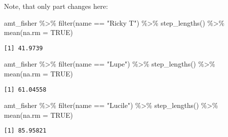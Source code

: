 \documentclass[ignorenonframetext,,t]{beamer}
\newenvironment{Shaded}{\begin{snugshade}}{\end{snugshade}}
\newcommand{\AttributeTok}[1]{\textcolor[rgb]{0.77,0.63,0.00}{#1}}
\newcommand{\ConstantTok}[1]{\textcolor[rgb]{0.00,0.00,0.00}{#1}}
\newcommand{\FunctionTok}[1]{\textcolor[rgb]{0.00,0.00,0.00}{#1}}
\newcommand{\NormalTok}[1]{#1}
\newcommand{\SpecialCharTok}[1]{\textcolor[rgb]{0.00,0.00,0.00}{#1}}
\newcommand{\StringTok}[1]{\textcolor[rgb]{0.31,0.60,0.02}{#1}}
\begin{document}
\begin{frame}[fragile]
Note, that only part changes here:

\begin{Shaded}
\begin{Highlighting}[]
\NormalTok{amt\_fisher }\SpecialCharTok{\%\textgreater{}\%} \FunctionTok{filter}\NormalTok{(name }\SpecialCharTok{==} \StringTok{"Ricky T"}\NormalTok{) }\SpecialCharTok{\%\textgreater{}\%} 
  \FunctionTok{step\_lengths}\NormalTok{() }\SpecialCharTok{\%\textgreater{}\%} \FunctionTok{mean}\NormalTok{(}\AttributeTok{na.rm =} \ConstantTok{TRUE}\NormalTok{)}
\end{Highlighting}
\end{Shaded}

\begin{verbatim}
[1] 41.9739
\end{verbatim}

\begin{Shaded}
\begin{Highlighting}[]
\NormalTok{amt\_fisher }\SpecialCharTok{\%\textgreater{}\%} \FunctionTok{filter}\NormalTok{(name }\SpecialCharTok{==} \StringTok{"Lupe"}\NormalTok{) }\SpecialCharTok{\%\textgreater{}\%} 
  \FunctionTok{step\_lengths}\NormalTok{() }\SpecialCharTok{\%\textgreater{}\%} \FunctionTok{mean}\NormalTok{(}\AttributeTok{na.rm =} \ConstantTok{TRUE}\NormalTok{)}
\end{Highlighting}
\end{Shaded}

\begin{verbatim}
[1] 61.04558
\end{verbatim}

\begin{Shaded}
\begin{Highlighting}[]
\NormalTok{amt\_fisher }\SpecialCharTok{\%\textgreater{}\%} \FunctionTok{filter}\NormalTok{(name }\SpecialCharTok{==} \StringTok{"Lucile"}\NormalTok{) }\SpecialCharTok{\%\textgreater{}\%} 
  \FunctionTok{step\_lengths}\NormalTok{() }\SpecialCharTok{\%\textgreater{}\%} \FunctionTok{mean}\NormalTok{(}\AttributeTok{na.rm =} \ConstantTok{TRUE}\NormalTok{)}
\end{Highlighting}
\end{Shaded}

\begin{verbatim}
[1] 85.95821
\end{verbatim}
\end{frame}
\end{document}
